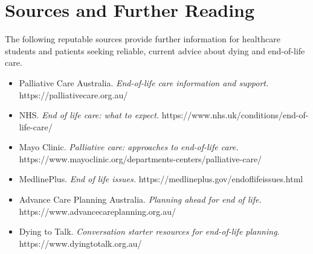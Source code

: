 \section*{Sources and Further Reading}
The following reputable sources provide further information for healthcare students and patients seeking reliable, current advice about dying and end-of-life care.
\begin{itemize}
    \item Palliative Care Australia. \textit{End-of-life care information and support.} https://palliativecare.org.au/
    \item NHS. \textit{End of life care: what to expect.} https://www.nhs.uk/conditions/end-of-life-care/
    \item Mayo Clinic. \textit{Palliative care: approaches to end-of-life care.} https://www.mayoclinic.org/departments-centers/palliative-care/
    \item MedlinePlus. \textit{End of life issues.} https://medlineplus.gov/endoflifeissues.html
    \item Advance Care Planning Australia. \textit{Planning ahead for end of life.} https://www.advancecareplanning.org.au/
    \item Dying to Talk. \textit{Conversation starter resources for end-of-life planning.} https://www.dyingtotalk.org.au/
\end{itemize}
